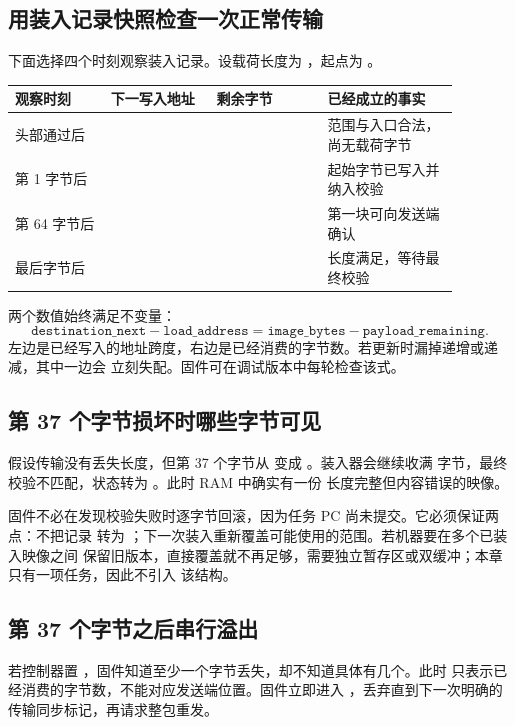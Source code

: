\subsection{用装入记录快照检查一次正常传输}

下面选择四个时刻观察装入记录。设载荷长度为 ，起点为
。

\begin{longtable}{|L{0.19\linewidth}|L{0.21\linewidth}|L{0.22\linewidth}|L{0.26\linewidth}|}
\hline
观察时刻 & 下一写入地址 & 剩余字节 & 已经成立的事实 \\ \hline
头部通过后 &  &  & 范围与入口合法，尚无载荷字节 \\ \hline
第 1 字节后 &  &  & 起始字节已写入并纳入校验 \\ \hline
第 64 字节后 &  &  & 第一块可向发送端确认 \\ \hline
最后字节后 &  &  & 长度满足，等待最终校验 \\ \hline
\end{longtable}

两个数值始终满足不变量：
\[
\texttt{destination\_next}-\texttt{load\_address}
=\texttt{image\_bytes}-\texttt{payload\_remaining}.
\]
左边是已经写入的地址跨度，右边是已经消费的字节数。若更新时漏掉递增或递减，其中一边会
立刻失配。固件可在调试版本中每轮检查该式。

\subsection{第 37 个字节损坏时哪些字节可见}

假设传输没有丢失长度，但第 37 个字节从  变成 。装入器会继续收满
 字节，最终校验不匹配，状态转为 。此时 RAM 中确实有一份
长度完整但内容错误的映像。

固件不必在发现校验失败时逐字节回滚，因为任务 PC 尚未提交。它必须保证两点：不把记录
转为 ；下一次装入重新覆盖可能使用的范围。若机器要在多个已装入映像之间
保留旧版本，直接覆盖就不再足够，需要独立暂存区或双缓冲；本章只有一项任务，因此不引入
该结构。

\subsection{第 37 个字节之后串行溢出}

若控制器置 ，固件知道至少一个字节丢失，却不知道具体有几个。此时
 只表示已经消费的字节数，不能对应发送端位置。固件立即进入
，丢弃直到下一次明确的传输同步标记，再请求整包重发。

